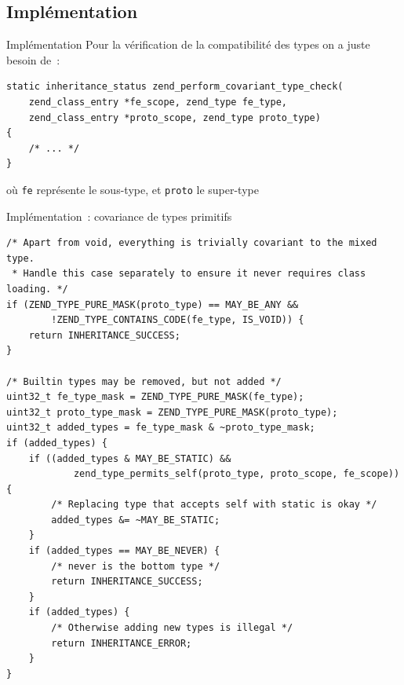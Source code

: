 \documentclass[10pt]{beamer}
\begin{document}
\subsection{Implémentation}
\begin{frame}[fragile]{Implémentation}
    Pour la vérification de la compatibilité des types on a juste besoin de~:
    \begin{verbatim}
static inheritance_status zend_perform_covariant_type_check(
    zend_class_entry *fe_scope, zend_type fe_type,
    zend_class_entry *proto_scope, zend_type proto_type)
{
    /* ... */
}
    \end{verbatim}
    où \texttt{fe} représente le sous-type, et \texttt{proto} le super-type
\end{frame}
\begin{frame}[fragile]{Implémentation~: covariance de types primitifs}
    \begin{verbatim}
/* Apart from void, everything is trivially covariant to the mixed type.
 * Handle this case separately to ensure it never requires class loading. */
if (ZEND_TYPE_PURE_MASK(proto_type) == MAY_BE_ANY &&
        !ZEND_TYPE_CONTAINS_CODE(fe_type, IS_VOID)) {
    return INHERITANCE_SUCCESS;
}

/* Builtin types may be removed, but not added */
uint32_t fe_type_mask = ZEND_TYPE_PURE_MASK(fe_type);
uint32_t proto_type_mask = ZEND_TYPE_PURE_MASK(proto_type);
uint32_t added_types = fe_type_mask & ~proto_type_mask;
if (added_types) {
    if ((added_types & MAY_BE_STATIC) &&
            zend_type_permits_self(proto_type, proto_scope, fe_scope)) {
        /* Replacing type that accepts self with static is okay */
        added_types &= ~MAY_BE_STATIC;
    }
    if (added_types == MAY_BE_NEVER) {
        /* never is the bottom type */
        return INHERITANCE_SUCCESS;
    }
    if (added_types) {
        /* Otherwise adding new types is illegal */
        return INHERITANCE_ERROR;
    }
}
    \end{verbatim}
\end{frame}
\end{document}
